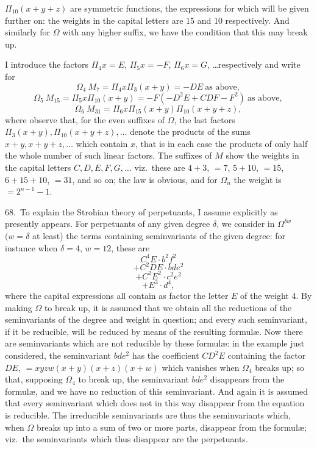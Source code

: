 \documentclass[11pt]{article}
\begin{document}
\clearpage
$\Pi_{10}(x + y + z)$ are symmetric functions, the expressions for which will be given further on: the weights in the capital letters are 15 and 10 respectively. And similarly for $\Omega$ with any higher suffix, we have the condition that this may break up.

I introduce the factors $\Pi_4 x = E$, $\Pi_5 x = -F$, $\Pi_6 x = G$, \ldots respectively and write for
\[
\Omega_4\ M_7 = \Pi_4 x \Pi_3 (x + y) = -DE\ \text{as above},
\]
\[
\Omega_5\ M_{15} = \Pi_5 x \Pi_{10} (x + y) = -F(-D^2E + CDF - F^2)\ \text{as above},
\]
\[
\Omega_6\ M_{31} = \Pi_6 x \Pi_{15} (x + y) \Pi_{10} (x + y + z),
\]
where observe that, for the even suffixes of $\Omega$, the last factors $\Pi_3 (x + y), \Pi_{10}(x + y + z), \ldots$ denote the products of the sums $x + y, x + y + z, \ldots$ which contain $x$, that is in each case the products of only half the whole number of such linear factors. The suffixes of $M$ show the weights in the capital letters $C, D, E, F, G, \ldots$ viz.\ these are $4 + 3$, $= 7$, $5 + 10$, $= 15$, $6 + 15 + 10$, $= 31$, and so on; the law is obvious, and for $\Omega_n$ the weight is $= 2^{n-1} - 1$.

68.\ To explain the Strohian theory of perpetuants, I assume explicitly as presently appears. For perpetuants of any given degree $\delta$, we consider in $\Omega^{\delta w}$ $(w = \delta$ at least) the terms containing seminvariants of the given degree: for instance when $\delta = 4$, $w = 12$, these are
\[
C^4E \cdot b^2f^2
\]
\[
+ C^2DE \cdot bde^2
\]
\[
+ C^2E^2 \cdot c^2e^2
\]
\[
+ E^3 \cdot d^4,
\]
where the capital expressions all contain as factor the letter $E$ of the weight 4. By making $\Omega$ to break up, it is assumed that we obtain all the reductions of the seminvariants of the degree and weight in question; and every such seminvariant, if it be reducible, will be reduced by means of the resulting formul\ae. Now there are seminvariants which are not reducible by these formul\ae: in the example just considered, the seminvariant $bde^2$ has the coefficient $CD^2E$ containing the factor $DE$, $= xyzw(x + y)(x + z)(x + w)$ which vanishes when $\Omega_4$ breaks up; so that, supposing $\Omega_4$ to break up, the seminvariant $bde^2$ disappears from the formul\ae, and we have no reduction of this seminvariant. And again it is assumed that every seminvariant which does not in this way disappear from the equation is reducible. The irreducible seminvariants are thus the seminvariants which, when $\Omega$ breaks up into a sum of two or more parts, disappear from the formul\ae; viz.\ the seminvariants which thus disappear are the perpetuants.
\end{document}

